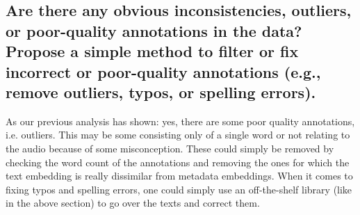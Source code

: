 \subsection{Are there any obvious inconsistencies, outliers, or poor-quality annotations in the data? Propose a
simple method to filter or fix incorrect or poor-quality annotations (e.g., remove outliers, typos, or
spelling errors).}
\label{sec:Annotation Quality:c2}
As our previous analysis has shown: yes, there are some poor quality annotations, i.e. outliers. This may be some consisting only of a single word or not relating to the audio because of some misconception. 
These could simply be removed by checking the word count of the annotations and removing the ones for which the text embedding is really dissimilar from metadata embeddings.
When it comes to fixing typos and spelling errors, one could simply use an off-the-shelf library (like in the above section) to go over the texts and correct them.